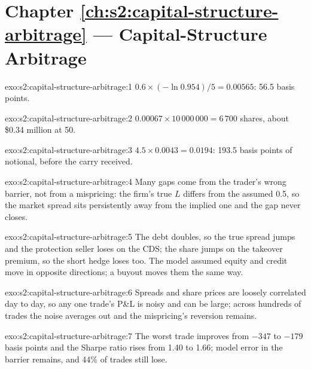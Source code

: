 \section*{Chapter \ref{ch:s2:capital-structure-arbitrage} --- Capital-Structure Arbitrage}

\begin{solution}{exo:s2:capital-structure-arbitrage:1}
$0.6 \times (-\ln 0.954)/5 = 0.00565$: 56.5 basis points.
\end{solution}

\begin{solution}{exo:s2:capital-structure-arbitrage:2}
$0.00067 \times 10\,000\,000 = 6\,700$ shares, about \$0.34 million at 50.
\end{solution}

\begin{solution}{exo:s2:capital-structure-arbitrage:3}
$4.5 \times 0.0043 = 0.0194$: 193.5 basis points of notional, before the carry received.
\end{solution}

\begin{solution}{exo:s2:capital-structure-arbitrage:4}
Many gaps come from the trader's wrong barrier, not from a mispricing: the firm's true $L$ differs from the assumed 0.5, so the market spread sits
persistently away from the implied one and the gap never closes.
\end{solution}

\begin{solution}{exo:s2:capital-structure-arbitrage:5}
The debt doubles, so the true spread jumps and the protection seller loses on the CDS; the share jumps on the takeover premium, so the short hedge
loses too. The model assumed equity and credit move in opposite directions; a buyout moves them the same way.
\end{solution}

\begin{solution}{exo:s2:capital-structure-arbitrage:6}
Spreads and share prices are loosely correlated day to day, so any one trade's P\&L is noisy and can be large; across hundreds of trades the noise
averages out and the mispricing's reversion remains.
\end{solution}

\begin{solution}{exo:s2:capital-structure-arbitrage:7}
The worst trade improves from $-347$ to $-179$ basis points and the Sharpe ratio rises from 1.40 to 1.66; model error in the barrier remains, and
44\% of trades still lose.
\end{solution}

